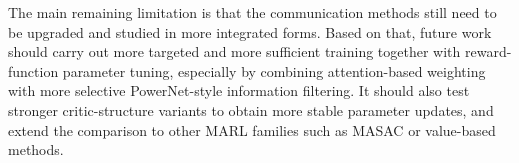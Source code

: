 The main remaining limitation is that the communication methods still need to
be upgraded and studied in more integrated forms. Based on that, future work
should carry out more targeted and more sufficient training together with
reward-function parameter tuning, especially by combining attention-based
weighting with more selective PowerNet-style information filtering. It should
also test stronger critic-structure variants to obtain more stable parameter
updates, and extend the comparison to other MARL families such as MASAC or
value-based methods.

